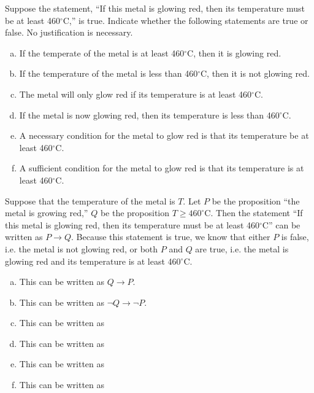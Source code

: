 \documentclass[11pt,letterpaper]{article}
\begin{document}
\newpage



 Suppose the statement, ``If this metal is glowing red, then its temperature must be at least 460$^\circ$C,'' is true. Indicate whether the following statements are true or false. No justification is necessary.
	\begin{enumerate}[(a)]
	\item If the temperate of the metal is at least 460$^\circ$C, then it is glowing red.
	\item If the temperature of the metal is less than 460$^\circ$C, then it is not glowing red.
	\item The metal will only glow red if its temperature is at least 460$^\circ$C.
	\item If the metal is now glowing red, then its temperature is less than 460$^\circ$C.
	\item A necessary condition for the metal to glow red is that its temperature be at least 460$^\circ$C.
	\item A sufficient condition for the metal to glow red is that its temperature is at least 460$^\circ$C.
	\end{enumerate} \pspace

\sol Suppose that the temperature of the metal is $T$. Let $P$ be the proposition ``the metal is growing red,'' $Q$ be the proposition $T \geq 460^\circ \text{C}$. Then the statement ``If this metal is glowing red, then its temperature must be at least 460$^\circ$C'' can be written as $P \to Q$. Because this statement is true, we know that either $P$ is false, i.e. the metal is not glowing red, or both $P$ and $Q$ are true, i.e. the metal is glowing red and its temperature is at least 460$^\circ$C. 

\begin{enumerate}[(a)]
\item This can be written as $Q \to P$.

\item This can be written as $\neg Q \to \neg P$.

\item This can be written as 

\item This can be written as  

\item This can be written as  

\item This can be written as  
\end{enumerate}
\end{document}
